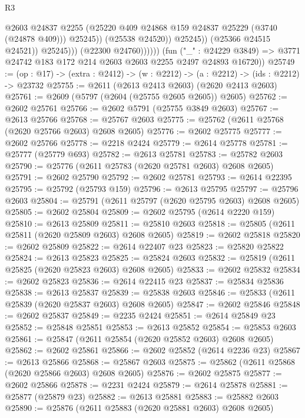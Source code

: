 \begin{lexlean}{R3}
\begin{coremodule}
                                  @2603
                                  @24837
                                  @2255
                                  (@25220 @409 @24868 @159 @24837 @25229 (@3740 (@24878 @409)))
                                  @25245))
                              (@25538 @24520))
                            @25245))
                        (@25366 @24515 @24521))
                      @25245)))
                (@22300 @24760))))))
      (fun ("_" : @24229 @3849) =>
      @3771 @24742 @183 @172 @214 @2603 @2603 @2255 @2497 @24893 @16720))
@25749 := (op : @17) -> (extra : @2412) -> (w : @2212) -> (a : @2212) -> (ids : @2212) -> @23732
@25755 := @2611 (@2613 @2413 @2603) (@2620 @2413 @2603)
@25761 := @2609 (@5797 (@2604 (@25755 @2605 @2605)) @2605)
@25762 := @2602 @25761
@25766 := @2602 @5791 (@25755 @3849 @2603)
@25767 := @2613 @25766
@25768 := @25767 @2603
@25775 := @25762 (@2611 @25768 (@2620 @25766 @2603) @2608 @2605)
@25776 := @2602 @25775
@25777 := @2602 @25766
@25778 := @2218 @2424
@25779 := @2614 @25778
@25781 := @25777 (@25779 @693)
@25782 := @2613 @25781
@25783 := @25782 @2603
@25790 := @25776 (@2611 @25783 (@2620 @25781 @2603) @2608 @2605)
@25791 := @2602 @25790
@25792 := @2602 @25781
@25793 := @2614 @22395
@25795 := @25792 (@25793 @159)
@25796 := @2613 @25795
@25797 := @25796 @2603
@25804 := @25791 (@2611 @25797 (@2620 @25795 @2603) @2608 @2605)
@25805 := @2602 @25804
@25809 := @2602 @25795 (@2614 @2220 @159)
@25810 := @2613 @25809
@25811 := @25810 @2603
@25818 := @25805 (@2611 @25811 (@2620 @25809 @2603) @2608 @2605)
@25819 := @2602 @25818
@25820 := @2602 @25809
@25822 := @2614 @22407 @23
@25823 := @25820 @25822
@25824 := @2613 @25823
@25825 := @25824 @2603
@25832 := @25819 (@2611 @25825 (@2620 @25823 @2603) @2608 @2605)
@25833 := @2602 @25832
@25834 := @2602 @25823
@25836 := @2614 @22415 @23
@25837 := @25834 @25836
@25838 := @2613 @25837
@25839 := @25838 @2603
@25846 := @25833 (@2611 @25839 (@2620 @25837 @2603) @2608 @2605)
@25847 := @2602 @25846
@25848 := @2602 @25837
@25849 := @2235 @2424
@25851 := @2614 @25849 @23
@25852 := @25848 @25851
@25853 := @2613 @25852
@25854 := @25853 @2603
@25861 := @25847 (@2611 @25854 (@2620 @25852 @2603) @2608 @2605)
@25862 := @2602 @25861
@25866 := @2602 @25852 (@2614 @2236 @23)
@25867 := @2613 @25866
@25868 := @25867 @2603
@25875 := @25862 (@2611 @25868 (@2620 @25866 @2603) @2608 @2605)
@25876 := @2602 @25875
@25877 := @2602 @25866
@25878 := @2231 @2424
@25879 := @2614 @25878
@25881 := @25877 (@25879 @23)
@25882 := @2613 @25881
@25883 := @25882 @2603
@25890 := @25876 (@2611 @25883 (@2620 @25881 @2603) @2608 @2605)

\end{coremodule}
\end{lexlean}
